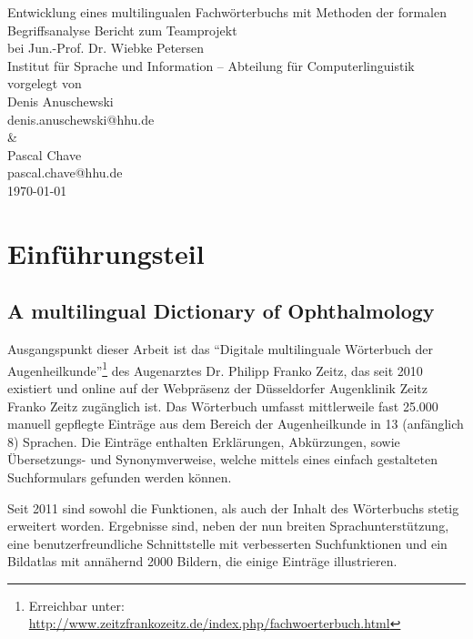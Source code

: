 \documentclass[pagesize,paper=A4,DIV=calc,fontsize=12pt,draft=false]{scrreprt}
\begin{document}
\begin{titlepage}
\begin{center}
\vfill
\LARGE
Entwicklung eines multilingualen Fachwörterbuchs mit Methoden der formalen Begriffsanalyse
\vfill 
\Large
Bericht zum Teamprojekt\\
bei Jun.-Prof. Dr. Wiebke Petersen\\
\vfill
\large
Institut für Sprache und Information -- Abteilung für Computerlinguistik
\vfill
\normalsize
vorgelegt von \\ Denis Anuschewski \\ denis.anuschewski@hhu.de\\ \& \\ Pascal Chave \\ pascal.chave@hhu.de \\
\vfill
\today
\vfill
\end{center}
\end{titlepage}

\tableofcontents

\chapter{Einführungsteil}

\section{A multilingual Dictionary of Ophthalmology}

Ausgangspunkt dieser Arbeit ist das \enquote{Digitale multilinguale Wörterbuch der Augenheilkunde}\footnote{Erreichbar unter: \href{http://www.zeitzfrankozeitz.de/index.php/fachwoerterbuch.html}{http://www.zeitzfrankozeitz.de/index.php/fachwoerterbuch.html}} des Augenarztes Dr. Philipp Franko Zeitz, das seit 2010 existiert und online auf der Webpräsenz der Düsseldorfer Augenklinik Zeitz Franko Zeitz zugänglich ist. 
Das Wörterbuch umfasst mittlerweile fast 25.000 manuell gepflegte Einträge aus dem Bereich der Augenheilkunde in 13 (anfänglich 8) Sprachen. 
Die Einträge enthalten Erklärungen, Abkürzungen, sowie Übersetzungs- und Synonymverweise, welche mittels eines einfach gestalteten Suchformulars gefunden werden können. 

Seit 2011 sind sowohl die Funktionen, als auch der Inhalt des Wörterbuchs stetig erweitert worden.
Ergebnisse sind, neben der nun breiten Sprachunterstützung, eine benutzerfreundliche Schnittstelle mit verbesserten Suchfunktionen und ein Bildatlas mit annähernd 2000 Bildern, die einige Einträge illustrieren. 
\end{document}
